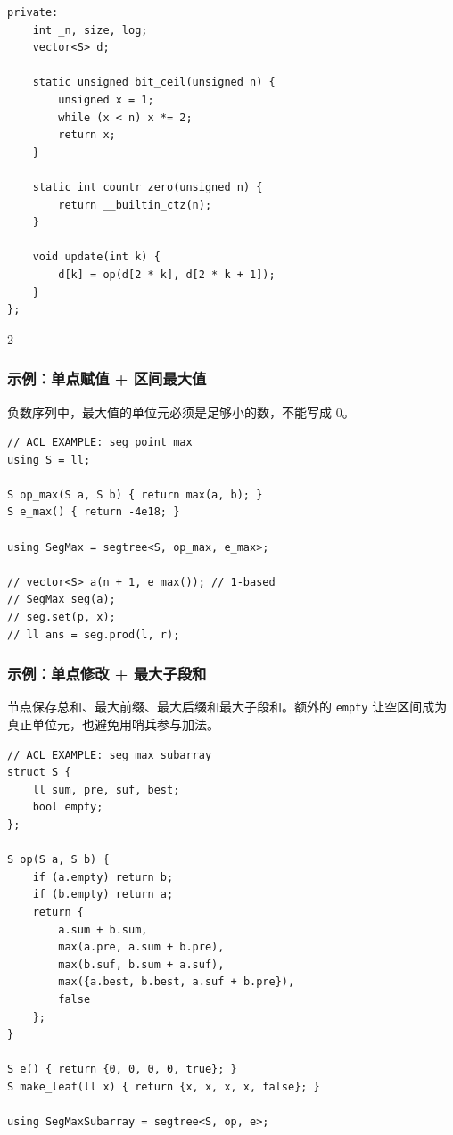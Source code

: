 \begin{verbatim}
private:
    int _n, size, log;
    vector<S> d;

    static unsigned bit_ceil(unsigned n) {
        unsigned x = 1;
        while (x < n) x *= 2;
        return x;
    }

    static int countr_zero(unsigned n) {
        return __builtin_ctz(n);
    }

    void update(int k) {
        d[k] = op(d[2 * k], d[2 * k + 1]);
    }
};
		\end{verbatim}

		\begin{multicols*}{2}

			\subsubsection{示例：单点赋值 + 区间最大值}

			负数序列中，最大值的单位元必须是足够小的数，不能写成 $0$。

			\begin{verbatim}
// ACL_EXAMPLE: seg_point_max
using S = ll;

S op_max(S a, S b) { return max(a, b); }
S e_max() { return -4e18; }

using SegMax = segtree<S, op_max, e_max>;

// vector<S> a(n + 1, e_max()); // 1-based
// SegMax seg(a);
// seg.set(p, x);
// ll ans = seg.prod(l, r);
			\end{verbatim}

			\subsubsection{示例：单点修改 + 最大子段和}

			节点保存总和、最大前缀、最大后缀和最大子段和。额外的 \texttt{empty} 让空区间成为真正单位元，也避免用哨兵参与加法。

			\begin{verbatim}
// ACL_EXAMPLE: seg_max_subarray
struct S {
    ll sum, pre, suf, best;
    bool empty;
};

S op(S a, S b) {
    if (a.empty) return b;
    if (b.empty) return a;
    return {
        a.sum + b.sum,
        max(a.pre, a.sum + b.pre),
        max(b.suf, b.sum + a.suf),
        max({a.best, b.best, a.suf + b.pre}),
        false
    };
}

S e() { return {0, 0, 0, 0, true}; }
S make_leaf(ll x) { return {x, x, x, x, false}; }

using SegMaxSubarray = segtree<S, op, e>;


\end{verbatim}
\end{multicols*}
